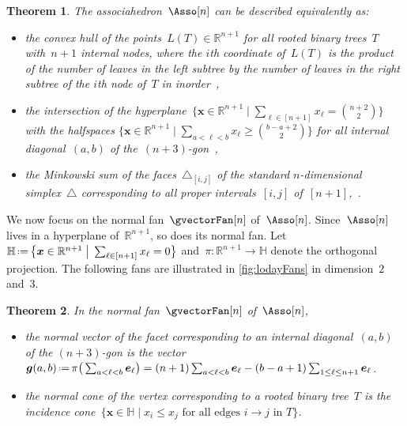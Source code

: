 \documentclass{amsart}
\newtheorem{theorem}{Theorem}[section]
\theoremstyle{definition}
\newcommand{\R}{\mathbb{R}} %
\newcommand{\HH}{\mathbb{H}} %
\renewcommand{\b}[1]{{\boldsymbol{#1}}} %
\newcommand{\bigset}[2]{\big\{ #1 \;\big|\; #2 \big\}} %
\newcommand{\eqdef}{\mbox{\,\raisebox{0.2ex}{\scriptsize\ensuremath{\mathrm:}}\ensuremath{=}\,}} %
\newcommand{\simplex}{\triangle} %
\newcommand{\gvector}[1]{\b{g}(#1)} %
\begin{document}
\begin{theorem}
\label{thm:associahedronLoday}
The associahedron~$\Asso[n]$ can be described equivalently as:
\begin{itemize}
\item the convex hull of the points~$L(T) \in \R^{n+1}$ for all rooted binary trees~$T$ with~$n+1$ internal nodes, where the $i$th coordinate of~$L(T)$ is the product of the number of leaves in the left subtree by the number of leaves in the right subtree of the $i$th node of~$T$ in inorder~\cite{Loday},
\item the intersection of the hyperplane~$\bigset{\b{x} \in \R^{n+1}}{\sum_{\ell \in [n+1]} x_\ell = \binom{n+2}{2}}$ with the halfspaces $\bigset{\b{x} \in \R^{n+1}}{\sum_{a < \ell < b} x_\ell \ge \binom{b-a+2}{2}}$ for all internal diagonal~$(a,b)$ of \mbox{the $(n+3)$-gon~\cite{ShniderSternberg}},
\item the Minkowski sum of the faces~$\simplex_{[i,j]}$ of the standard $n$-dimensional simplex~$\simplex$ corresponding to all proper intervals~$[i,j]$ of~$[n+1]$,~\cite{Postnikov}.
\end{itemize}
\end{theorem}

\enlargethispage{.1cm}
We now focus on the normal fan~$\gvectorFan[n]$ of~$\Asso[n]$.
Since~$\Asso[n]$ lives in a hyperplane of~$\R^{n+1}$, so does its normal fan.
Let~$\HH \eqdef \bigset{\b{x} \in \R^{n+1}}{\sum_{\ell \in [n+1]} x_\ell = 0}$ and~$\pi : \R^{n+1} \to \HH$ denote the orthogonal projection.
The following fans are illustrated in \cref{fig:lodayFans} in dimension~$2$ and~$3$.

\begin{theorem}
\label{thm:normalFanLoday}
In the normal fan~$\gvectorFan[n]$ of~$\Asso[n]$, 
\begin{itemize}
\item the normal vector of the facet corresponding to an internal diagonal~$(a,b)$ of the $(n+3)$-gon is the vector~$\gvector{a,b} \eqdef \pi\big( \sum_{a < \ell < b} \b{e}_\ell \big) = (n+1) \sum_{a < \ell < b} \b{e}_\ell - (b-a+1) \sum_{1 \le \ell \le n+1} \b{e}_\ell$.
\item the normal cone of the vertex corresponding to a rooted binary tree~$T$ is the incidence cone~$\bigset{\b{x} \in \HH}{x_i \le x_j \text{ for all edges $i \to j$ in $T$}}$.
\end{itemize}
\end{theorem}
\end{document}
